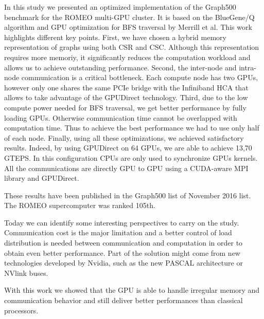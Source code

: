 In this study we presented an optimized implementation of the Graph500 benchmark for the ROMEO  multi-GPU cluster. 
It is based on the BlueGene/Q algorithm and GPU optimization for BFS traversal by Merrill et al. 
This work highlights different key points.
First, we have chosen a hybrid memory representation of graphs using both CSR and CSC. %
Although this representation requires more memoriy, it significantly reduces  the computation workload and allows us to achieve outstanding performance.
Second, the inter-node and intra-node communication is a critical bottleneck. 
Each compute node has two GPUs, however only one shares the same PCIe bridge with the Infiniband HCA that allows to take advantage of the GPUDirect technology.
Third, due to the low compute power needed for BFS traversal, we get better performance by fully loading GPUs.
Otherwise communication time cannot be overlapped with computation time. 
Thus to achieve the best performance we had to use only half of each node.
Finally, using all these optimizations, we achieved satisfactory results. 
Indeed, by using GPUDirect on 64 GPUs,  we are able to achieve 13,70 GTEPS. 
In this configuration CPUs are only used to synchronize GPUs kernels. 
All the communications are directly GPU to GPU using a CUDA-aware MPI library and GPUDirect.

These results have been published in the Graph500 list of November 2016 list. 
The ROMEO supercomputer was ranked 105th. 

Today we can identify some interesting perspectives to carry on the study. 
Communication cost is the major limitation and a better control of load distribution is needed between communication and computation in order to obtain even better performance.
Part of the solution might come from new technologies developed by Nvidia, such as the new PASCAL architecture or NVlink buses.

With this work we showed that the GPU is able to handle irregular memory and communication behavior and still deliver better performances than classical processors. 
 